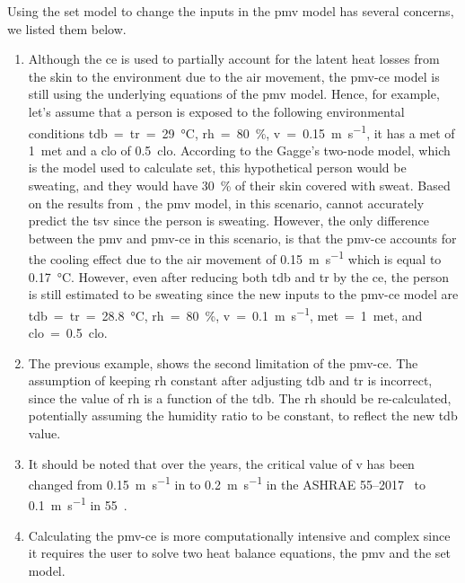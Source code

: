 Using the \ac{set} model to change the inputs in the \ac{pmv} model has several concerns, we listed them below.
\begin{enumerate}
    \item Although the \ac{ce} is used to partially account for the latent heat losses from the skin to the environment due to the air movement, the \ac{pmv-ce} model is still using the underlying equations of the \ac{pmv} model.
    Hence, for example, let's assume that a person is exposed to the following environmental conditions \ac{tdb}~=~\ac{tr}~=~\qty{29}{\celsius}, \ac{rh}~=~\qty{80}{\percent}, \ac{v}~=~\qty{0.15}{\m\per\s}, it has a \ac{met} of \qty{1}{met} and a \ac{clo} of \qty{0.5}{clo}.
    According to the Gagge's two-node model, which is the model used to calculate \ac{set}, this hypothetical person would be sweating, and they would have \qty{30}{\percent} of their skin covered with sweat.
    Based on the results from , the \ac{pmv} model, in this scenario, cannot accurately predict the \ac{tsv} since the person is sweating.
    However, the only difference between the \ac{pmv} and \ac{pmv-ce} in this scenario, is that the \ac{pmv-ce} accounts for the cooling effect due to the air movement of \qty{0.15}{\m\per\s} which is equal to \qty{.17}{\celsius}.
    However, even after reducing both \ac{tdb} and \ac{tr} by the \ac{ce}, the person is still estimated to be sweating since the new inputs to the \ac{pmv-ce} model are \ac{tdb}~=~\ac{tr}~=~\qty{28.8}{\celsius}, \ac{rh}~=~\qty{80}{\percent}, \ac{v}~=~\qty{0.1}{\m\per\s}, \ac{met}~=~\qty{1}{met}, and \ac{clo}~=~\qty{0.5}{clo}.
    \item The previous example, shows the second limitation of the \ac{pmv-ce}. 
    The assumption of keeping \ac{rh} constant after adjusting \ac{tdb} and \ac{tr} is incorrect, since the value of \ac{rh} is a function of the \ac{tdb}.
    The \ac{rh} should be re-calculated, potentially assuming the humidity ratio to be constant, to reflect the new \ac{tdb} value.
    \item It should be noted that over the years, the critical value of \ac{v} has been changed from \qty{0.15}{\m\per\s} in  to \qty{0.2}{\m\per\s} in the ASHRAE 55--2017~\cite{ASHRAE552017, arens_moving_2009} to \qty{0.1}{\m\per\s} in \gls{55}~\cite{ashrae552023}.
    \item Calculating the \ac{pmv-ce} is more computationally intensive and complex since it requires the user to solve two heat balance equations, the \ac{pmv} and the \ac{set} model.

\end{enumerate}
